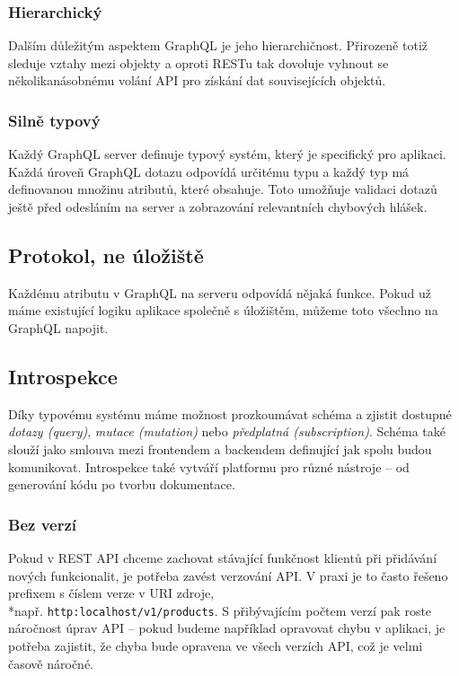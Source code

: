 \documentclass[thesis=M,czech]{FITthesis}[2019/12/23]
\begin{document}
\clearpage

\subsubsection*{Hierarchický}
Dalším důležitým aspektem GraphQL je jeho hierarchičnost. Přirozeně totiž sleduje vztahy mezi objekty a oproti RESTu tak dovoluje vyhnout se několikanásobnému volání API pro získání dat souvisejících objektů.

\subsubsection*{Silně typový}
Každý GraphQL server definuje typový systém, který je specifický pro aplikaci.
Každá úroveň GraphQL dotazu odpovídá určitému typu a každý typ má definovanou množinu atributů, které obsahuje. Toto umožňuje validaci dotazů ještě před odesláním na server a zobrazování relevantních chybových hlášek.

\subsection{Protokol, ne úložiště}
Každému atributu v GraphQL na serveru odpovídá nějaká funkce. Pokud už máme existující logiku aplikace společně s úložištěm, můžeme toto všechno na GraphQL napojit.

\subsection{Introspekce}
Díky typovému systému máme možnost prozkoumávat schéma a zjistit dostupné \textit{dotazy (query)}, \textit{mutace (mutation)} nebo \textit{předplatná (subscription)}. Schéma také slouží jako smlouva mezi frontendem a backendem definující jak spolu budou komunikovat.
Introspekce také vytváří platformu pro různé nástroje -- od generování kódu po tvorbu dokumentace.

\subsubsection*{Bez verzí}
Pokud v REST API chceme zachovat stávající funkčnost klientů při přidávání nových funkcionalit, je potřeba zavést verzování API. V praxi je to často řešeno prefixem s číslem verze v URI zdroje,\\*např. \texttt{http:localhost/v1/products}. S přibývajícím počtem verzí pak roste náročnost úprav API -- pokud budeme například opravovat chybu v aplikaci, je potřeba zajistit, že chyba bude opravena ve všech verzích API, což je velmi časově náročné.
\end{document}
